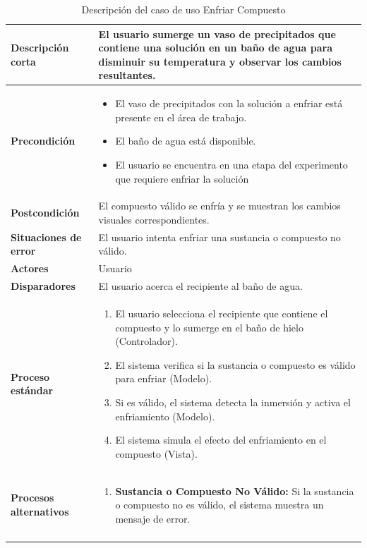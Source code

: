 \begin{longtable}{>{\raggedright\arraybackslash}m{} >{\raggedright\arraybackslash}m{}}
    \endlastfoot
    \textbf{Descripción corta} &  El usuario sumerge un vaso de precipitados que contiene una solución en un baño de agua para disminuir su temperatura y observar los cambios resultantes. \\
    \midrule
    \textbf{Precondición} & 
    \begin{itemize}
        \item El vaso de precipitados con la solución a enfriar está presente en el área de trabajo. 
        \item El baño de agua está disponible. 
        \item El usuario se encuentra en una etapa del experimento que requiere enfriar la solución 
    \end{itemize}\\
    \midrule
    \textbf{Postcondición} &  El compuesto válido se enfría y se muestran los cambios visuales correspondientes.\\
    \midrule
    \textbf{Situaciones de error} & El usuario intenta enfriar una sustancia o compuesto no válido.\\
    \midrule
    \textbf{Actores} & Usuario \\
    \midrule
    \textbf{Disparadores} & El usuario acerca el recipiente al baño de agua.\\
    \midrule
    \textbf{Proceso estándar} &
    \begin{enumerate}
        \item El usuario selecciona el recipiente que contiene el compuesto y lo sumerge en el baño de hielo (Controlador). 
        \item El sistema verifica si la sustancia o compuesto es válido para enfriar (Modelo). 
        \item Si es válido, el sistema detecta la inmersión y activa el enfriamiento (Modelo). 
        \item El sistema simula el efecto del enfriamiento en el compuesto (Vista).  
    \end{enumerate} \\
    \midrule
    \textbf{Procesos alternativos} & 
    \begin{enumerate}[{2}A. ]
        \item \textbf{Sustancia o Compuesto No Válido:} Si la sustancia o compuesto no es válido, el sistema muestra un mensaje de error. 
    \end{enumerate}\\
    \midrule
    \caption{Descripción del caso de uso Enfriar Compuesto}
    \label{tab:Caso_de_uso_ Balancear_Enfriar_Compuesto}
\end{longtable}

